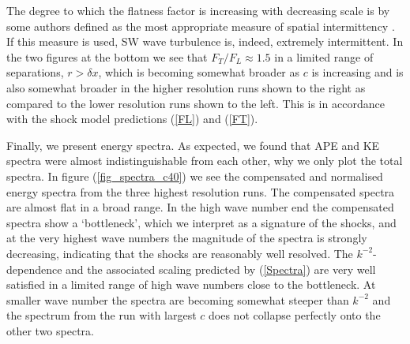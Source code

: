 The degree to which the flatness factor is increasing with decreasing scale is by some authors defined  as the most appropriate measure of spatial intermittency \cite[see for example][]{Frisch}. If this measure is used, SW wave turbulence is, indeed, extremely intermittent.  In the two figures at the bottom we see that $ F_{T}/F_{L} \approx 1.5 $ in a limited range of separations, $ r > \delta x $, which is becoming somewhat broader as $ c $ is increasing and  is also somewhat broader in the higher resolution runs shown to the right as compared to the lower resolution runs shown to the left. This is in accordance with the shock model predictions (\ref{FL}) and (\ref{FT}).

Finally, we present  energy spectra. As expected, we found that APE and KE spectra were almost indistinguishable from each other, why we only plot the total spectra. In figure (\ref{fig_spectra_c40}) we see the compensated and normalised energy spectra from the three highest resolution runs. The compensated spectra are almost flat in a broad range. In the high wave number end the compensated spectra show a `bottleneck', which we interpret as a signature of the shocks, and at the very highest wave numbers the magnitude of the spectra is strongly decreasing, indicating that the shocks are reasonably well resolved. The $ k^{-2} $-dependence and the associated scaling predicted by (\ref{Spectra}) are very well satisfied in a limited range of high wave numbers close to the bottleneck. At smaller wave number the spectra are becoming somewhat steeper than $ k^{-2} $ and the spectrum from the run with largest $ c $ does not collapse perfectly onto the other two spectra. 




